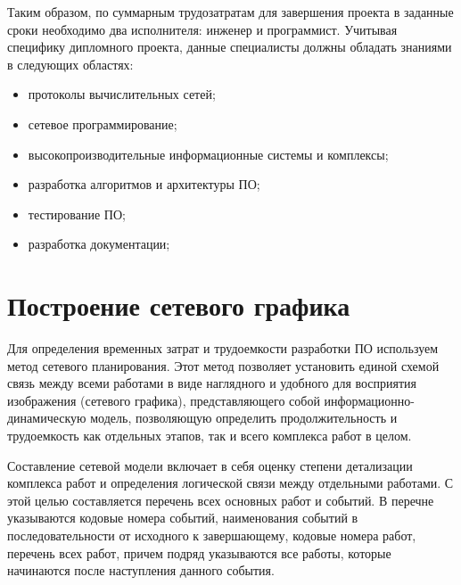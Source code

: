 Таким образом, по суммарным трудозатратам для завершения проекта в заданные сроки необходимо два исполнителя: инженер и программист. Учитывая специфику дипломного проекта, данные специалисты должны обладать знаниями в следующих областях:
\begin{itemize}
\item протоколы вычислительных сетей;
\item сетевое программирование;
\item высокопроизводительные информационные системы и комплексы;
\item разработка алгоритмов и архитектуры ПО;
\item тестирование ПО;
\item разработка документации;
\end{itemize}

\section{Построение сетевого графика}
Для определения временных затрат и трудоемкости разработки ПО используем метод сетевого планирования. Этот метод позволяет установить единой схемой связь между всеми работами в виде наглядного и удобного для восприятия изображения (сетевого графика), представляющего собой информационно-динамическую модель, позволяющую определить продолжительность и трудоемкость как отдельных этапов, так и всего комплекса работ в целом.

Составление сетевой модели включает в себя оценку степени детализации комплекса работ и определения логической связи между отдельными работами. С этой целью составляется перечень всех основных работ и событий. В перечне указываются кодовые номера событий, наименования событий в последовательности от исходного к завершающему, кодовые номера работ, перечень всех работ, причем подряд указываются все работы, которые начинаются после наступления данного события.

